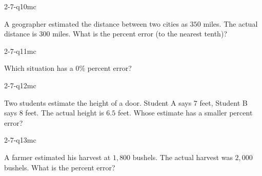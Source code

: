 \begin{practiceQuestion}{2-7-q10}{mc}
\begin{questionText}
A geographer estimated the distance between two cities as $350$ miles. The actual distance is $300$ miles. What is the percent error (to the nearest tenth)?
\end{questionText}
\end{practiceQuestion}

\begin{practiceQuestion}{2-7-q11}{mc}
\begin{questionText}
Which situation has a $0\%$ percent error?
\end{questionText}
\end{practiceQuestion}

\begin{practiceQuestion}{2-7-q12}{mc}
\begin{questionText}
Two students estimate the height of a door. Student A says $7$ feet, Student B says $8$ feet. The actual height is $6.5$ feet. Whose estimate has a smaller percent error?
\end{questionText}
\end{practiceQuestion}

\begin{practiceQuestion}{2-7-q13}{mc}
\begin{questionText}
A farmer estimated his harvest at $1{,}800$ bushels. The actual harvest was $2{,}000$ bushels. What is the percent error?
\end{questionText}
\end{practiceQuestion}

